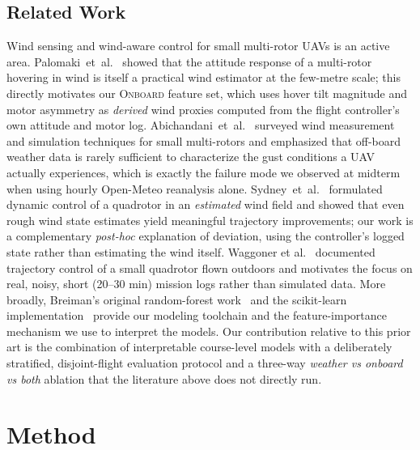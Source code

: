 \documentclass[sigconf, nonacm]{acmart}
\begin{document}
\subsection{Related Work}
Wind sensing and wind-aware control for small multi-rotor UAVs is an
active area.  Palomaki~et~al.~\cite{palomaki2017} showed that the attitude
response of a multi-rotor hovering in wind is itself a practical wind
estimator at the few-metre scale; this directly motivates our
\textsc{Onboard} feature set, which uses hover tilt magnitude and motor
asymmetry as \emph{derived} wind proxies computed from the flight
controller's own attitude and motor log.  Abichandani~et~al.~\cite{abichandani2020}
surveyed wind measurement and simulation techniques for small multi-rotors
and emphasized that off-board weather data is rarely sufficient to
characterize the gust conditions a UAV actually experiences, which is
exactly the failure mode we observed at midterm when using hourly
Open-Meteo reanalysis alone.  Sydney~et~al.~\cite{sydney2013} formulated
dynamic control of a quadrotor in an \emph{estimated} wind field and showed
that even rough wind state estimates yield meaningful trajectory
improvements; our work is a complementary \emph{post-hoc} explanation of
deviation, using the controller's logged state rather than estimating the
wind itself.  Waggoner et al.~\cite{waggoner2014} documented trajectory
control of a small quadrotor flown outdoors and motivates the focus on
real, noisy, short (20--30 min) mission logs rather than simulated data.
More broadly, Breiman's original random-forest work~\cite{breiman2001}
and the scikit-learn implementation~\cite{scikit} provide our modeling
toolchain and the feature-importance mechanism we use to interpret the
models.  Our contribution relative to this prior art is the combination of
interpretable course-level models with a deliberately stratified,
disjoint-flight evaluation protocol and a three-way \emph{weather vs
onboard vs both} ablation that the literature above does not directly run.

\section{Method}
\end{document}
